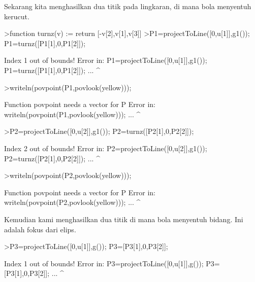 \documentclass[a4paper,10pt]{article}
\begin{document}
\begin{eulernotebook}
\begin{eulercomment}
\begin{eulercomment}
\begin{eulercomment}
\begin{eulercomment}
\begin{eulercomment}
\begin{eulercomment}
\begin{eulercomment}
\begin{eulercomment}
\begin{eulercomment}
\begin{eulercomment}
\begin{eulercomment}
\begin{eulercomment}
\begin{eulercomment}
\begin{eulercomment}
\begin{eulercomment}
\begin{eulercomment}
\begin{eulercomment}
Sekarang kita menghasilkan dua titik pada lingkaran, di mana bola
menyentuh kerucut.
\end{eulercomment}
\begin{eulerprompt}
>function turnz(v) := return [-v[2],v[1],v[3]]
>P1=projectToLine([0,u[1]],g1()); P1=turnz([P1[1],0,P1[2]]);
\end{eulerprompt}
\begin{euleroutput}
  Index 1 out of bounds!
  Error in:
  P1=projectToLine([0,u[1]],g1()); P1=turnz([P1[1],0,P1[2]]); ...
                          ^
\end{euleroutput}
\begin{eulerprompt}
>writeln(povpoint(P1,povlook(yellow)));
\end{eulerprompt}
\begin{euleroutput}
  Function povpoint needs a vector for P
  Error in:
  writeln(povpoint(P1,povlook(yellow))); ...
                                      ^
\end{euleroutput}
\begin{eulerprompt}
>P2=projectToLine([0,u[2]],g1()); P2=turnz([P2[1],0,P2[2]]);
\end{eulerprompt}
\begin{euleroutput}
  Index 2 out of bounds!
  Error in:
  P2=projectToLine([0,u[2]],g1()); P2=turnz([P2[1],0,P2[2]]); ...
                          ^
\end{euleroutput}
\begin{eulerprompt}
>writeln(povpoint(P2,povlook(yellow)));
\end{eulerprompt}
\begin{euleroutput}
  Function povpoint needs a vector for P
  Error in:
  writeln(povpoint(P2,povlook(yellow))); ...
                                      ^
\end{euleroutput}
\begin{eulercomment}
Kemudian kami menghasilkan dua titik di mana bola menyentuh bidang.
Ini adalah fokus dari elips.
\end{eulercomment}
\begin{eulerprompt}
>P3=projectToLine([0,u[1]],g()); P3=[P3[1],0,P3[2]];
\end{eulerprompt}
\begin{euleroutput}
  Index 1 out of bounds!
  Error in:
  P3=projectToLine([0,u[1]],g()); P3=[P3[1],0,P3[2]]; ...
                          ^
\end{euleroutput}
\begin{eulerprompt}

\end{eulerprompt}
\end{eulercomment}
\end{eulercomment}
\end{eulercomment}
\end{eulercomment}
\end{eulercomment}
\end{eulercomment}
\end{eulercomment}
\end{eulercomment}
\end{eulercomment}
\end{eulercomment}
\end{eulercomment}
\end{eulercomment}
\end{eulercomment}
\end{eulercomment}
\end{eulercomment}
\end{eulercomment}
\end{eulernotebook}
\end{document}
